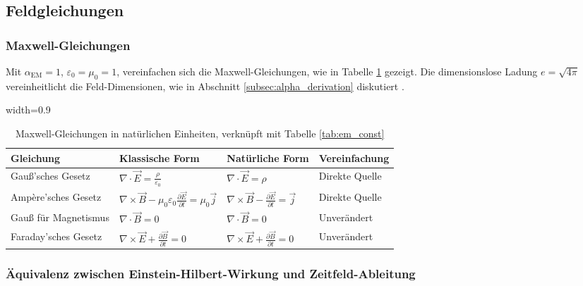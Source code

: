 \documentclass[12pt,a4paper]{article}
\newcommand{\alphaEM}{\alpha_{\text{EM}}}
\newcommand{\tablescale}{0.9}
\begin{document}
	\subsection{Feldgleichungen}
	\label{sec:field_equations}
	
	\subsubsection{Maxwell-Gleichungen}
	\label{subsec:maxwell}
	
	Mit \(\alphaEM = 1\), \(\varepsilon_0 = \mu_0 = 1\), vereinfachen sich die Maxwell-Gleichungen, wie in Tabelle \ref{tab:maxwell} gezeigt. Die dimensionslose Ladung \(e = \sqrt{4\pi}\) vereinheitlicht die Feld-Dimensionen, wie in Abschnitt \ref{subsec:alpha_derivation} diskutiert \cite{pascher_alpha_2025}.
	
	\begin{table}[htbp]
		\centering
		\begin{adjustbox}{width=\tablescale\textwidth}
			\begin{tabular}{llll}
				\toprule
				\textbf{Gleichung} & \textbf{Klassische Form} & \textbf{Natürliche Form} & \textbf{Vereinfachung} \\
				\midrule
				Gauß’sches Gesetz & \(\nabla \cdot \vec{E} = \frac{\rho}{\varepsilon_0}\) & \(\nabla \cdot \vec{E} = \rho\) & Direkte Quelle \\
				Ampère’sches Gesetz & \(\nabla \times \vec{B} - \mu_0 \varepsilon_0 \frac{\partial \vec{E}}{\partial t} = \mu_0 \vec{j}\) & \(\nabla \times \vec{B} - \frac{\partial \vec{E}}{\partial t} = \vec{j}\) & Direkte Quelle \\
				Gauß für Magnetismus & \(\nabla \cdot \vec{B} = 0\) & \(\nabla \cdot \vec{B} = 0\) & Unverändert \\
				Faraday’sches Gesetz & \(\nabla \times \vec{E} + \frac{\partial \vec{B}}{\partial t} = 0\) & \(\nabla \times \vec{E} + \frac{\partial \vec{B}}{\partial t} = 0\) & Unverändert \\
				\bottomrule
			\end{tabular}
		\end{adjustbox}
		\caption{Maxwell-Gleichungen in natürlichen Einheiten, verknüpft mit Tabelle \ref{tab:em_const}}
		\label{tab:maxwell}
	\end{table}
	\subsubsection{Äquivalenz zwischen Einstein-Hilbert-Wirkung und Zeitfeld-Ableitung}
	
\end{document}
